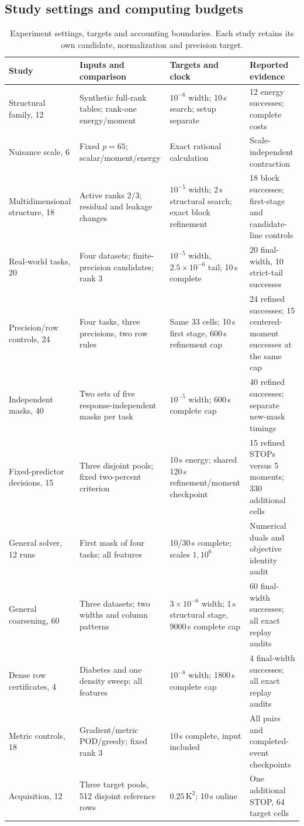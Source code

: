 \subsection{Study settings and computing budgets}\label{app:protocol-v80}
\begin{table}[t]\centering\small\setlength{\tabcolsep}{4pt}
\caption{Experiment settings, targets and accounting boundaries. Each study retains its own candidate, normalization and precision target.}\label{tab:protocol-v80}
\begin{tabular}{p{}p{}p{}p{}}\toprule
Study&Inputs and comparison&Targets and clock&Reported evidence\\\midrule
Structural family, 12&Synthetic full-rank tables; rank-one energy/moment&$10^{-6}$ width; 10\,s search; setup separate&12 energy successes; complete costs\\
Nuisance scale, 6&Fixed $p=65$; scalar/moment/energy&Exact rational calculation&Scale-independent contraction\\
Multidimensional structure, 18&Active ranks 2/3; residual and leakage changes&$10^{-5}$ width; 2\,s structural search; exact block refinement&18 block successes; first-stage and candidate-line controls\\
Real-world tasks, 20&Four datasets; finite-precision candidates; rank 3&$10^{-5}$ width, $2.5\times10^{-6}$ tail; 10\,s complete&20 final-width, 10 strict-tail successes\\
Precision/row controls, 24&Four tasks, three precisions, two row rules&Same 33 cells; 10\,s first stage, 600\,s refinement cap&24 refined successes; 15 centered-moment successes at the same cap\\
Independent masks, 40&Two sets of five response-independent masks per task&$10^{-5}$ width; 600\,s complete cap&40 refined successes; separate new-mask timings\\
Fixed-predictor decisions, 15&Three disjoint pools; fixed two-percent criterion&10\,s energy; shared 120\,s refinement/moment checkpoint&15 refined STOPs versus 5 moments; 330 additional cells\\
General solver, 12 runs&First mask of four tasks; all features&10/30\,s complete; scales $1,10^6$&Numerical duals and objective identity audit\\
General coarsening, 60&Three datasets; two widths and column patterns&$3\times10^{-6}$ width; 1\,s structural stage, 9000\,s complete cap&60 final-width successes; all exact replay audits\\
Dense row certificates, 4&Diabetes and one density sweep; all features&$10^{-8}$ width; 1800\,s complete cap&4 final-width successes; all exact replay audits\\
Metric controls, 18&Gradient/metric POD/greedy; fixed rank 3&10\,s complete, input included&All pairs and completed-event checkpoints\\
Acquisition, 12&Three target pools, 512 disjoint reference rows&$0.25\,\mathrm{K}^2$; 10\,s online&One additional STOP, 64 target cells\\
\bottomrule\end{tabular}\end{table}

